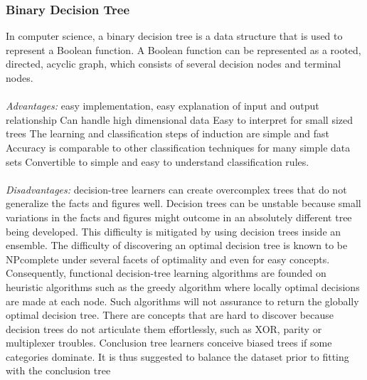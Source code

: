 \documentclass[14pt]{extarticle}
\begin{document}
\subsubsection{Binary   Decision Tree}
In computer science, a binary decision tree is a data structure that is used to represent a Boolean function. A Boolean function can be represented as a rooted, directed, acyclic graph, which consists of several decision nodes and terminal nodes.
\\
\\
\emph{Advantages:} easy implementation, easy explanation of input and output relationship Can handle high dimensional data Easy to interpret for small sized trees The learning and classification steps of induction are simple and fast Accuracy is comparable to other classification techniques for many simple data sets Convertible to simple and easy to understand classification rules.
\\
\\
\emph{Disadvantages:} decision-tree learners can create overcomplex trees that do not generalize the facts and figures well. Decision trees can be unstable because small variations in the facts and figures might outcome in an absolutely different tree being developed. This difficulty is mitigated by using decision trees inside an ensemble. The difficulty of discovering an optimal decision tree is known to be NPcomplete under several facets of optimality and even for easy concepts. Consequently, functional decision-tree learning algorithms are founded on heuristic algorithms such as the greedy algorithm where locally optimal decisions are made at each node. Such algorithms will not assurance to return the globally optimal decision tree. There are concepts that are hard to discover because decision trees do not articulate them effortlessly, such as XOR, parity or multiplexer troubles. Conclusion tree learners conceive biased trees if some categories dominate. It is thus suggested to balance the dataset prior to fitting with the conclusion tree
\\
\\
\end{document}
